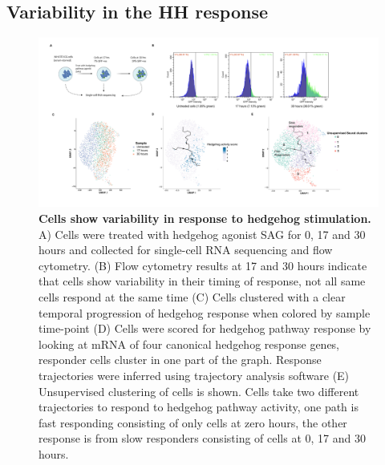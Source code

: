 \subsection{Variability in the HH response}
\begin{figure}[t!]  
    \centering
    \includegraphics[width=\linewidth]{figures/hedgehog/hh_figure1.pdf}
    \caption[Cells show variability in response to hedgehog stimulation.]{%
        \textbf{Cells show variability in response to hedgehog stimulation.}
        A) Cells were treated with hedgehog agonist SAG for 0, 17 and 30 hours and collected for single-cell RNA sequencing and flow cytometry. (B) Flow cytometry results at 17 and 30 hours indicate that cells show variability in their timing of response, not all same cells respond at the same time (C) Cells clustered with a clear temporal progression of hedgehog response when colored by sample time-point (D) Cells were scored for hedgehog pathway response by looking at mRNA of four canonical hedgehog response genes, responder cells cluster in one part of the graph. Response trajectories were inferred using trajectory analysis software (E) Unsupervised clustering of cells is shown. Cells take two different trajectories to respond to hedgehog pathway activity, one path is fast responding consisting of only cells at zero hours, the other response is from slow responders consisting of cells at 0, 17 and 30 hours.
    }
    \label{fig:hh_figure1}
\end{figure}

